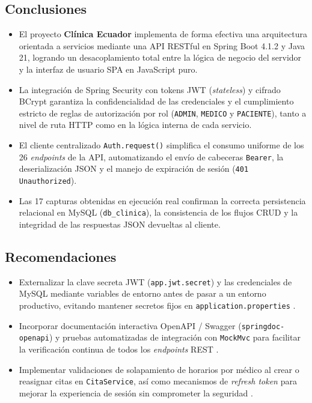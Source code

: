\documentclass{article}
\begin{document}
\subsection{Conclusiones}
\begin{itemize}
    \item El proyecto \textbf{Clínica Ecuador} implementa de forma efectiva una arquitectura orientada a servicios mediante una API RESTful en Spring Boot 4.1.2 y Java 21, logrando un desacoplamiento total entre la lógica de negocio del servidor y la interfaz de usuario SPA en JavaScript puro.
    \item La integración de Spring Security con tokens JWT (\textit{stateless}) y cifrado BCrypt garantiza la confidencialidad de las credenciales y el cumplimiento estricto de reglas de autorización por rol (\texttt{ADMIN}, \texttt{MEDICO} y \texttt{PACIENTE}), tanto a nivel de ruta HTTP como en la lógica interna de cada servicio.
    \item El cliente centralizado \texttt{Auth.request()} simplifica el consumo uniforme de los 26 \textit{endpoints} de la API, automatizando el envío de cabeceras \texttt{Bearer}, la deserialización JSON y el manejo de expiración de sesión (\texttt{401 Unauthorized}).
    \item Las 17 capturas obtenidas en ejecución real confirman la correcta persistencia relacional en MySQL (\texttt{db\_clinica}), la consistencia de los flujos CRUD y la integridad de las respuestas JSON devueltas al cliente.
\end{itemize}


\subsection{Recomendaciones}
\begin{itemize}
    \item Externalizar la clave secreta JWT (\texttt{app.jwt.secret}) y las credenciales de MySQL mediante variables de entorno antes de pasar a un entorno productivo, evitando mantener secretos fijos en \texttt{application.properties} \cite{rfc7519}.
    \item Incorporar documentación interactiva OpenAPI / Swagger (\texttt{springdoc-openapi}) y pruebas automatizadas de integración con \texttt{MockMvc} para facilitar la verificación continua de todos los \textit{endpoints} REST \cite{springboot2025}.
    \item Implementar validaciones de solapamiento de horarios por médico al crear o reasignar citas en \texttt{CitaService}, así como mecanismos de \textit{refresh token} para mejorar la experiencia de sesión sin comprometer la seguridad \cite{fielding2000}.
\end{itemize}
\end{document}
